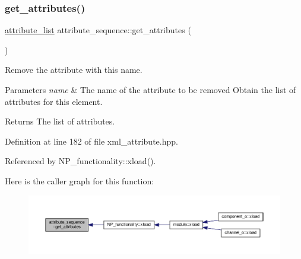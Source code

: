 \subsubsection{\texorpdfstring{get\+\_\+attributes()}{get\_attributes()}\hspace{0.1cm}{\footnotesize\ttfamily [1/2]}}
{\footnotesize\ttfamily \hyperlink{structattribute__sequence_ac9a1c1462a6334a140de3925dbeaae96}{attribute\+\_\+list} attribute\+\_\+sequence\+::get\+\_\+attributes (\begin{DoxyParamCaption}{ }\end{DoxyParamCaption})\hspace{0.3cm}{\ttfamily [inline]}}



Remove the attribute with this name. 


\begin{DoxyParams}{Parameters}
{\em name} & The name of the attribute to be removed Obtain the list of attributes for this element. \\
\hline
\end{DoxyParams}
\begin{DoxyReturn}{Returns}
The list of attributes. 
\end{DoxyReturn}


Definition at line 182 of file xml\+\_\+attribute.\+hpp.



Referenced by N\+P\+\_\+functionality\+::xload().

Here is the caller graph for this function\+:
\nopagebreak
\begin{figure}[H]
\begin{center}
\leavevmode
\includegraphics[width=350pt]{de/d33/structattribute__sequence_a4d995fdfcb7e65006b615e8c1dd4f96b_icgraph}
\end{center}
\end{figure}
\mbox{\label{structattribute__sequence_a1ac607e291e7717872691d5d25a6b956}} 
